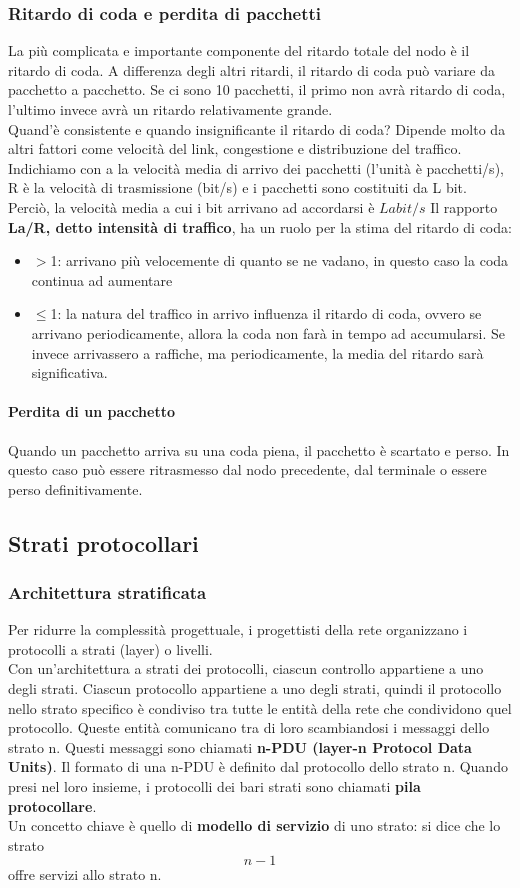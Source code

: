 \documentclass[11pt,a4paper]{article}
\begin{document}
\subsubsection{Ritardo di coda e perdita di pacchetti}
La più complicata e importante componente del ritardo totale del nodo è il ritardo di coda. A differenza degli altri ritardi, il ritardo di coda può variare da pacchetto a pacchetto. Se ci sono 10 pacchetti, il primo non avrà ritardo di coda, l'ultimo invece avrà un ritardo relativamente grande. \\
Quand'è consistente e quando insignificante il ritardo di coda? Dipende molto da altri fattori come velocità del link, congestione e distribuzione del traffico.
Indichiamo con a la velocità media di arrivo dei pacchetti (l'unità è pacchetti/s), R è la velocità di trasmissione (bit/s) e i pacchetti sono costituiti da L bit. Perciò, la velocità media a cui i bit arrivano ad accordarsi è $La bit/s$
Il rapporto \textbf{La/R, detto intensità di traffico}, ha un ruolo per la stima del ritardo di coda:
\begin{itemize}
	\item $>$1: arrivano più velocemente di quanto se ne vadano, in questo caso la coda continua ad aumentare
	\item $\leq$1: la natura del traffico in arrivo influenza il ritardo di coda, ovvero se arrivano 	periodicamente, allora la coda non farà in tempo ad accumularsi. Se invece arrivassero a raffiche, ma periodicamente, la media del ritardo sarà significativa.
\end{itemize}
\paragraph{Perdita di un pacchetto}
Quando un pacchetto arriva su una coda piena, il pacchetto è scartato e perso. In questo caso può essere ritrasmesso dal nodo precedente, dal terminale o essere perso definitivamente.

\subsection{Strati protocollari}
\subsubsection{Architettura stratificata}
Per ridurre la complessità progettuale, i progettisti della rete organizzano i protocolli a strati (layer) o livelli. \\
Con un'architettura a strati dei protocolli, ciascun controllo appartiene a uno degli strati. Ciascun protocollo appartiene a uno degli strati, quindi il protocollo nello strato specifico è condiviso tra tutte le entità della rete che condividono quel protocollo. Queste entità comunicano tra di loro scambiandosi i messaggi dello strato n. Questi messaggi sono chiamati \textbf{n-PDU (layer-n Protocol Data Units)}. Il formato di una n-PDU è definito dal protocollo dello strato n. Quando presi nel loro insieme, i protocolli dei bari strati sono chiamati \textbf{pila protocollare}.\\
Un concetto chiave è quello di \textbf{modello di servizio} di uno strato: si dice che lo strato $$n - 1$$ offre servizi allo strato n.
\end{document}
